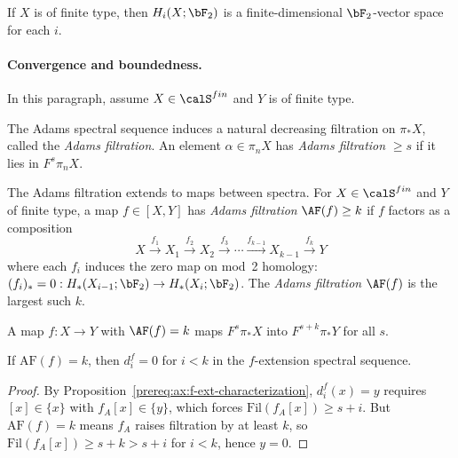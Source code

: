\begin{axiom}\label{prereq:ax:finite-type-homology}
    If $X$ is of finite type, then $H_i(X; \bF_2)$ is a finite-dimensional $\bF_2$-vector space for each $i$.
\end{axiom}

\paragraph{Convergence and boundedness.}

In this paragraph, assume $X \in \calS^{fin}$ and $Y$ is of finite type.

\begin{axiom}\label{prereq:ax:adams-filtration}
    \leanok
    The Adams spectral sequence induces a natural decreasing filtration on $\pi_* X$, called the \emph{Adams filtration}. An element $\alpha \in \pi_n X$ has \emph{Adams filtration} $\ge s$ if it lies in $F^s \pi_n X$.
\end{axiom}

\begin{definition}\label{prereq:def:adams-filtration-maps}
    \leanok
    The Adams filtration extends to maps between spectra. For $X \in \calS^{fin}$ and $Y$ of finite type, a map $f \in [X, Y]$ has \emph{Adams filtration} $\AF(f) \ge k$ if $f$ factors as a composition
    $$X \xrightarrow{f_1} X_1 \xrightarrow{f_2} X_2 \xrightarrow{f_3} \cdots \xrightarrow{f_{k-1}} X_{k-1} \xrightarrow{f_k} Y$$
    where each $f_i$ induces the zero map on mod~2 homology: $(f_i)_* = 0: H_*(X_{i-1}; \bF_2) \to H_*(X_i; \bF_2)$. The \emph{Adams filtration} $\AF(f)$ is the largest such $k$.
\end{definition}

\begin{axiom}\label{prereq:ax:adams-filtration-characterization}
    \leanok
    A map $f: X \to Y$ with $\AF(f) = k$ maps $F^s \pi_* X$ into $F^{s+k} \pi_* Y$ for all $s$.
\end{axiom}

\begin{axiom}\label{prereq:ax:af-vanishing}
    \notready
    If $\mathrm{AF}(f) = k$, then $d_i^f = 0$ for $i < k$ in the $f$-extension spectral sequence.
\end{axiom}
\begin{proof}\leanok By Proposition~\ref{prereq:ax:f-ext-characterization}, $d_i^f(x) = y$ requires $[x] \in \{x\}$ with $f_A[x] \in \{y\}$, which forces $\mathrm{Fil}(f_A[x]) \ge s + i$. But $\mathrm{AF}(f) = k$ means $f_A$ raises filtration by at least $k$, so $\mathrm{Fil}(f_A[x]) \ge s + k > s + i$ for $i < k$, hence $y = 0$.\end{proof}

